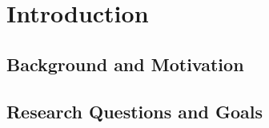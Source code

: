 \chapter{Introduction}

\section{Background and Motivation}
    





\clearpage
\section{Research Questions and Goals}

